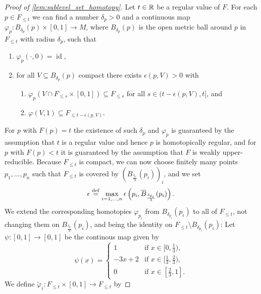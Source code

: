 \begin{proof}[Proof of \cref{lem:sublevel_set_homotopy}]
	Let $t \in \mathbb{R}$ be a regular value of $F$.
	For each $p \in F_{\leq t}$ we can find a number $\delta_{p} > 0$ and a continuous map $\varphi_{p} \colon B_{\delta_{p}}(p) \times [0,1] \to M$, where $B_{\delta_{p}}(p)$ is the open metric ball around $p$ in $F_{\leq t}$ with radius $\delta_{p}$, such that
	\begin{enumerate}
		\item $\varphi_{p}(\cdot,0) = \operatorname{id}$,
		\item for all $V \subseteq B_{\delta_{p}}(p)$ compact there exists $\epsilon(p,V) > 0$ with
		\begin{enumerate}
			\item $\varphi_{p}(V \cap F_{\leq s}\times [0,1]) \subseteq F_{\leq s}$ for all $s \in (t - \epsilon(p,V), t]$, and
			\item $\varphi(V,1) \subseteq F_{\leq t - \epsilon(p,V)}$.
		\end{enumerate}
	\end{enumerate}
	For $p$ with $F(p) = t$ the existence of such $\delta_{p}$ and $\varphi_{p}$ is guaranteed by the assumption that $t$ is a regular value and hence $p$ is homotopically regular,
	and for $p$ with $F(p) < t$ it is guaranteed by the assumption that $F$ is weakly upper-reducible.
	Because $F_{\leq t}$ is compact, we can now choose finitely many points $p_{1}, \dots, p_{n}$ such that $F_{\leq t}$ is covered by $( B_{\frac{\delta_{p_{i}}}{3}}(p_{i}))_{i}$, and we set
	\[
		\epsilon \stackrel{\mathrm{def}}{=} \max_{i = 1,\dots,n} \epsilon \left( p_{i}, \overline{B}_{\frac{\delta_{p_{i}}}{3}}(p_{i}) \right).
	\]
	We extend the corresponding homotopies $\varphi_{p_{i}}$ from $B_{\delta_{p_{i}}}(p_{i})$ to all of $F_{\leq t}$, not changing them on $B_{\frac{\delta_{p_{i}}}{3}}(p_{i})$, and being the identity on $F_{\leq t} \setminus B_{\delta_{p_{i}}}(p_{i})$:
	Let $\psi \colon [0,1] \to [0,1]$ be the continous map given by
	\[
		\psi(x) =
		\begin{cases}
			1 & \text{if } x \in [0,\frac{1}{3}), \\
			-3x + 2 & \text{if } x \in [\frac{1}{3}, \frac{2}{3}), \\
			0 & \text{if } x \in [\frac{2}{3},1].
		\end{cases}
	\]
	We define $\tilde{\varphi}_{i} \colon F_{\leq t} \times [0,1] \to F_{\leq t}$ by

\end{proof}
